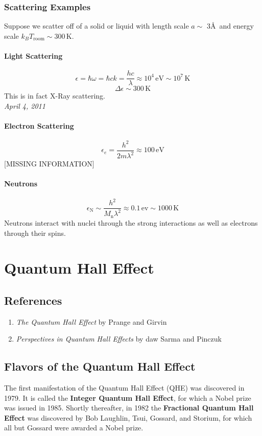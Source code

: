 \documentclass{article}
\begin{document}
			\subsubsection{Scattering Examples}
			Suppose we scatter off of a solid or liquid with length scale $a\sim$ 3\AA\  and energy scale $k_BT_{\mathrm{room}}\sim300\,\mathrm{K}$.
			\paragraph{Light Scattering} 
			$$\epsilon=\hbar\omega=\hbar ck=\frac{hc}{\lambda}\approx 10^4\,\mathrm{eV}\sim10^7\,\mathrm{K}$$
			$$\Delta \epsilon\sim 300\,\mathrm{K}$$
			This is in fact X-Ray scattering.\\
						\noindent\textit{April 4, 2011}
			\paragraph{Electron Scattering} 
			$$\epsilon_e=\frac{h^2}{2m\lambda^2}\approx 100\,\mathrm{eV}$$
			[MISSING INFORMATION]
			\paragraph {Neutrons}
			$$\epsilon_\mathrm{N}\sim \frac{h^2}{M_\mathrm{n}\lambda^2}\approx 0.1\,\mathrm{ev}\sim 1000\,\mathrm{K}$$
			Neutrons interact with nuclei through the strong interactions as well as electrons through their spins.
			\section{Quantum Hall Effect}
	\subsection{References}
		\begin{enumerate}
		\item \textit{The Quantum  Hall Effect} by Prange and Girvin
		\item \textit{Perspectives in Quantum Hall Effects} by daw Sarma and Pinczuk
		\end{enumerate}
	\subsection{Flavors of the Quantum Hall Effect}
	The first manifestation of the Quantum Hall Effect (QHE) was discovered in 1979. It is called the \textbf{Integer Quantum Hall Effect}, for which a Nobel prize was issued in 1985. Shortly thereafter, in 1982 the \textbf{Fractional Quantum Hall Effect}  was discovered by Bob Laughlin, Tsui, Gossard, and Storium, for which all but Gossard were awarded a Nobel prize.
\end{document}
